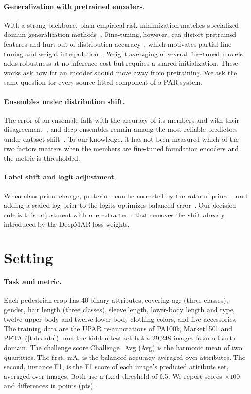 \documentclass[10pt,twocolumn,letterpaper]{article}
\begin{document}
\paragraph{Generalization with pretrained encoders.} With a strong backbone, plain empirical risk minimization matches specialized domain generalization methods~\cite{domainbed}. Fine-tuning, however, can distort pretrained features and hurt out-of-distribution accuracy~\cite{lpft}, which motivates partial fine-tuning and weight interpolation~\cite{wiseft}. Weight averaging of several fine-tuned models~\cite{soups,diwa} adds robustness at no inference cost but requires a shared initialization. These works ask how far an encoder should move away from pretraining. We ask the same question for every source-fitted component of a PAR system.

\paragraph{Ensembles under distribution shift.} The error of an ensemble falls with the accuracy of its members and with their disagreement~\cite{krogh}, and deep ensembles remain among the most reliable predictors under dataset shift~\cite{deepens,ovadia}. To our knowledge, it has not been measured which of the two factors matters when the members are fine-tuned foundation encoders and the metric is thresholded.

\paragraph{Label shift and logit adjustment.} When class priors change, posteriors can be corrected by the ratio of priors~\cite{saerens,lipton}, and adding a scaled log prior to the logits optimizes balanced error~\cite{logitadj}. Our decision rule is this adjustment with one extra term that removes the shift already introduced by the DeepMAR loss weights.

\section{Setting}
\label{sec:setting}

\paragraph{Task and metric.} Each pedestrian crop has 40 binary attributes, covering age (three classes), gender, hair length (three classes), sleeve length, lower-body length and type, twelve upper-body and twelve lower-body clothing colors, and five accessories. The training data are the UPAR re-annotations of PA100k, Market1501 and PETA (\cref{tab:data}), and the hidden test set holds 29{,}248 images from a fourth domain. The challenge score Challenge\_Avg (Avg) is the harmonic mean of two quantities. The first, mA, is the balanced accuracy averaged over attributes. The second, instance F1, is the F1 score of each image's predicted attribute set, averaged over images. Both use a fixed threshold of 0.5. We report scores $\times100$ and differences in points (pts).
\end{document}
